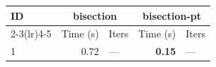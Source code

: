 \begin{longtable}{lr@{\hskip 4pt}l@{\hskip 12pt}r@{\hskip 4pt}l@{\hskip 12pt}}
\toprule
ID & \multicolumn{2}{c}{bisection} & \multicolumn{2}{c}{bisection-pt} \\
\cmidrule(lr){2-3}\cmidrule(lr){4-5}
 & Time (s) &  Iters & Time (s) &  Iters \\
\midrule
\endhead
1 & 0.72 & --- & \textbf{0.15} & --- \\
\bottomrule
\end{longtable}